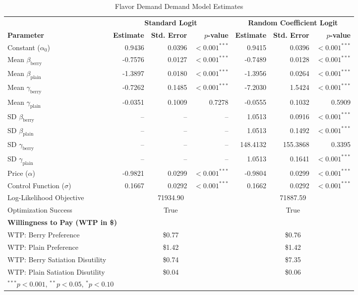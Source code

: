 \documentclass[11pt]{article}
\theoremstyle{definition}
\theoremstyle{remark}
\begin{document}
\begin{table}[htbp]
\centering
\caption{Flavor Demand Demand Model Estimates}
\label{tab:satiation_estimates}
\renewcommand{\arraystretch}{1.2}
{\setlength{\tabcolsep}{3.2pt}
\begin{tabular}{l r r r r r r}
\toprule
& \multicolumn{3}{c}{\textbf{Standard Logit}} & \multicolumn{3}{c}{\textbf{Random Coefficient Logit}} \\
\cmidrule(lr){2-4} \cmidrule(lr){5-7}
\textbf{Parameter} & \textbf{Estimate} & \textbf{Std. Error} & \textbf{$p$-value} & \textbf{Estimate} & \textbf{Std. Error} & \textbf{$p$-value} \\
\midrule
Constant ($\alpha_0$) & 0.9436 & 0.0396 & $< 0.001^{***}$ & 0.9415 & 0.0396 & $< 0.001^{***}$ \\
Mean $\beta_{\text{berry}}$ & -0.7576 & 0.0127 &$< 0.001^{***}$ & -0.7489 & 0.0128 & $< 0.001^{***}$ \\
Mean $\beta_{\text{plain}}$ & -1.3897 & 0.0180 &$< 0.001^{***}$ & -1.3956 & 0.0264 & $< 0.001^{***}$ \\
Mean $\gamma_{\text{berry}}$ & -0.7262 & 0.1485 & $< 0.001^{***}$ & -7.2030 & 1.5424 & $< 0.001^{***}$ \\
Mean $\gamma_{\text{plain}}$ & -0.0351 & 0.1009 & 0.7278 & -0.0555 & 0.1032 & 0.5909 \\
SD $\beta_{\text{berry}}$ & -- & -- & -- & 1.0513 & 0.0916 & $< 0.001^{***}$ \\
SD $\beta_{\text{plain}}$ & -- & -- & -- & 1.0513 & 0.1492 & $< 0.001^{***}$ \\
SD $\gamma_{\text{berry}}$ & -- & -- & -- & 148.4132 & 155.3868 & 0.3395 \\
SD $\gamma_{\text{plain}}$ & -- & -- & -- & 1.0513 & 0.1641 & $< 0.001^{***}$ \\
Price ($\alpha$) & -0.9821 & 0.0299 & $< 0.001^{***}$ & -0.9804 & 0.0299 & $< 0.001^{***}$ \\
Control Function ($\sigma$) & 0.1667 & 0.0292 & $< 0.001^{***}$ & 0.1662 & 0.0292 & $< 0.001^{***}$ \\
\midrule
Log-Likelihood Objective & \multicolumn{3}{c}{71934.90} & \multicolumn{3}{c}{71887.59} \\
Optimization Success & \multicolumn{3}{c}{True} & \multicolumn{3}{c}{True} \\
\midrule
\multicolumn{7}{l}{\textbf{Willingness to Pay (WTP in \$)}} \\
WTP: Berry Preference & \multicolumn{3}{c}{\$0.77} & \multicolumn{3}{c}{\$0.76} \\
WTP: Plain Preference & \multicolumn{3}{c}{\$1.42} & \multicolumn{3}{c}{\$1.42} \\
WTP: Berry Satiation Disutility & \multicolumn{3}{c}{\$0.74} & \multicolumn{3}{c}{\$7.35} \\
WTP: Plain Satiation Disutility & \multicolumn{3}{c}{\$0.04} & \multicolumn{3}{c}{\$0.06} \\
\bottomrule
\multicolumn{7}{l}{\footnotesize {$^{***}p<0.001$, $^{**}p<0.05$, $^*p<0.10$}}
\end{tabular}}
\end{table}
\end{document}
